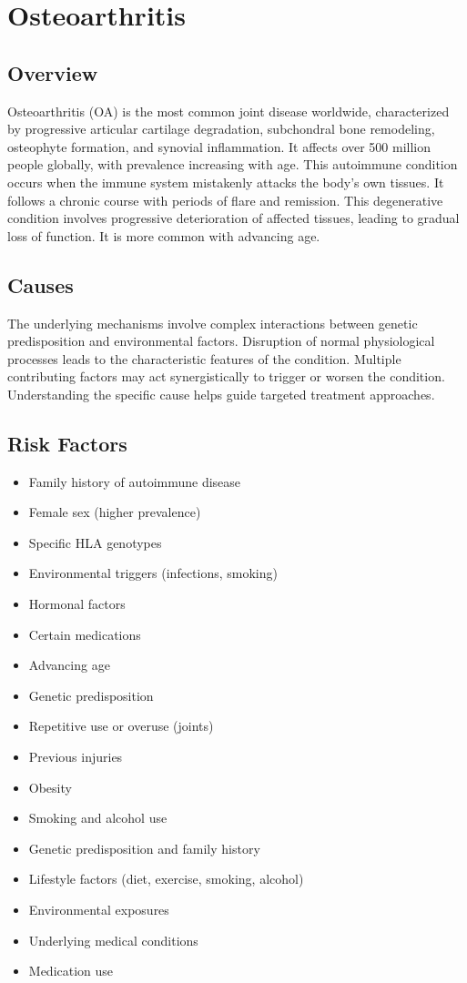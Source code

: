 \chapter{Osteoarthritis}
\label{sec:Osteoarthritis}

\section{Overview}
Osteoarthritis (OA) is the most common joint disease worldwide, characterized by progressive articular cartilage degradation, subchondral bone remodeling, osteophyte formation, and synovial inflammation. It affects over 500 million people globally, with prevalence increasing with age. This autoimmune condition occurs when the immune system mistakenly attacks the body's own tissues. It follows a chronic course with periods of flare and remission. This degenerative condition involves progressive deterioration of affected tissues, leading to gradual loss of function. It is more common with advancing age.
\section{Causes}
The underlying mechanisms involve complex interactions between genetic predisposition and environmental factors. Disruption of normal physiological processes leads to the characteristic features of the condition. Multiple contributing factors may act synergistically to trigger or worsen the condition. Understanding the specific cause helps guide targeted treatment approaches.
\section{Risk Factors}


\begin{itemize}[noitemsep]
  \item Family history of autoimmune disease
  \item Female sex (higher prevalence)
  \item Specific HLA genotypes
  \item Environmental triggers (infections, smoking)
  \item Hormonal factors
  \item Certain medications
  \item Advancing age
  \item Genetic predisposition
  \item Repetitive use or overuse (joints)
  \item Previous injuries
  \item Obesity
  \item Smoking and alcohol use
  \item Genetic predisposition and family history
  \item Lifestyle factors (diet, exercise, smoking, alcohol)
  \item Environmental exposures
  \item Underlying medical conditions
  \item Medication use
\end{itemize}
